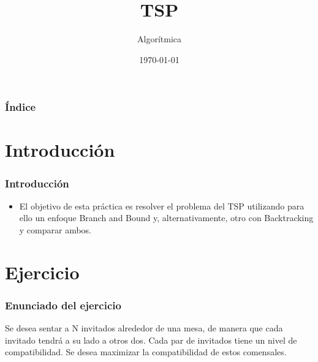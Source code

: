 \documentclass{beamer}
\title[Práctica 4]{TSP} %
\author{Algorítmica} %
\institute[UGR] %
{
Universidad de Granada \\ %
\medskip

}
\date{\today} %
\begin{document}
\begin{frame}
\titlepage %
\end{frame}

\begin{frame}
\frametitle{Índice} %
\tableofcontents %
\end{frame}


\section{Introducción }
\begin{frame}
	\frametitle{Introducción}
	\begin{itemize}
		\item El objetivo de esta práctica es resolver el problema del TSP utilizando para ello un enfoque Branch and Bound y, alternativamente, otro con Backtracking y comparar ambos.
	\end{itemize}
\end{frame}


\section{Ejercicio} 
\begin{frame}
	\frametitle{Enunciado del ejercicio}
	Se desea sentar a N invitados alrededor de una mesa, de manera que cada invitado tendrá a su lado a otros dos. Cada par de invitados tiene un nivel de compatibilidad. Se desea maximizar la compatibilidad de estos comensales.
	
\end{frame}

\end{document}
